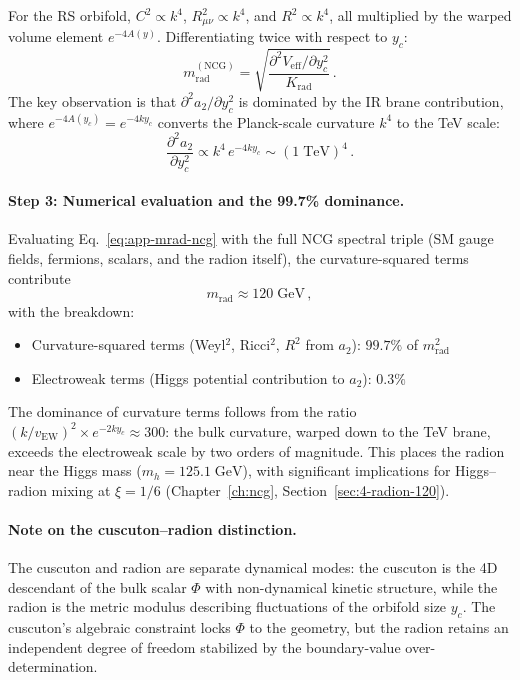 For the RS orbifold, $C^2 \propto k^4$, $R_{\mu\nu}^2 \propto k^4$, and $R^2 \propto k^4$, all multiplied by the warped volume element $e^{-4A(y)}$.  Differentiating twice with respect to $y_c$:
\begin{equation}
  m_{\mathrm{rad}}^{(\mathrm{NCG})} = \sqrt{\frac{\partial^2 V_{\mathrm{eff}} / \partial y_c^2}{K_{\mathrm{rad}}}}\,.
  \label{eq:app-mrad-ncg}
\end{equation}
The key observation is that $\partial^2 a_2 / \partial y_c^2$ is dominated by the IR brane contribution, where $e^{-4A(y_c)} = e^{-4ky_c}$ converts the Planck-scale curvature $k^4$ to the TeV scale:
\begin{equation}
  \frac{\partial^2 a_2}{\partial y_c^2} \propto k^4\,e^{-4ky_c} \sim (1\;\mathrm{TeV})^4\,.
\end{equation}

\paragraph{Step 3: Numerical evaluation and the 99.7\% dominance.}
Evaluating Eq.~\eqref{eq:app-mrad-ncg} with the full NCG spectral triple (SM gauge fields, fermions, scalars, and the radion itself), the curvature-squared terms contribute
\begin{equation}
  m_{\mathrm{rad}} \approx 120\;\mathrm{GeV}\,,
\end{equation}
with the breakdown:
\begin{itemize}
  \item Curvature-squared terms (Weyl$^2$, Ricci$^2$, $R^2$ from $a_2$): $99.7\%$ of $m_{\mathrm{rad}}^2$
  \item Electroweak terms (Higgs potential contribution to $a_2$): $0.3\%$
\end{itemize}
The dominance of curvature terms follows from the ratio $(k/v_{\mathrm{EW}})^2 \times e^{-2ky_c} \approx 300$: the bulk curvature, warped down to the TeV brane, exceeds the electroweak scale by two orders of magnitude.  This places the radion near the Higgs mass ($m_h = 125.1\;\mathrm{GeV}$), with significant implications for Higgs--radion mixing at $\xi = 1/6$ (Chapter~\ref{ch:ncg}, Section~\ref{sec:4-radion-120}).

\paragraph{Note on the cuscuton--radion distinction.} The cuscuton and radion are separate dynamical modes: the cuscuton is the 4D descendant of the bulk scalar $\Phi$ with non-dynamical kinetic structure, while the radion is the metric modulus describing fluctuations of the orbifold size $y_c$. The cuscuton's algebraic constraint locks $\Phi$ to the geometry, but the radion retains an independent degree of freedom stabilized by the boundary-value over-determination.

